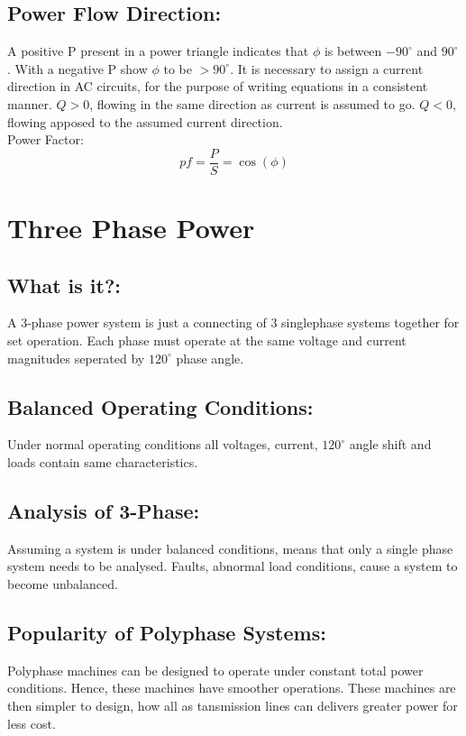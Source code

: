 \documentclass[a5paper]{article}
\begin{document}
	\subsection{Power Flow Direction:}
	A positive P present in a power triangle indicates that $\phi$ is between $-90^{\circ}$ and $90^{\circ}$. With a negative P show $\phi$ to be $>90^{\circ}$. It is necessary to assign a current direction in AC circuits, for the purpose of writing equations in a consistent manner. $Q>0$, flowing in the same direction as current is assumed to go. $Q<0$, flowing apposed to the assumed current direction.\\
	Power Factor:
	$$pf=\frac{P}{S}=\cos(\phi)$$

	\section{Three Phase Power}
	\subsection{What is it?:}
	A 3-phase power system is just a connecting of 3 singlephase systems together for set operation. Each phase must operate at the same voltage and current magnitudes seperated by $120^{\circ}$ phase angle.
	\subsection{Balanced Operating Conditions:}
	Under normal operating conditions all voltages, current, $120^{\circ}$ angle shift and loads contain same characteristics.
	\subsection{Analysis of 3-Phase:}
	Assuming a system is under balanced conditions, means that only a single phase system needs to be analysed. Faults, abnormal load conditions, cause a system to become unbalanced.
	\subsection{Popularity of Polyphase Systems:}
	Polyphase machines can be designed to operate under constant total power conditions. Hence, these machines have smoother operations. These machines are then simpler to design, how all as tansmission lines can delivers greater power for less cost.
\end{document}
